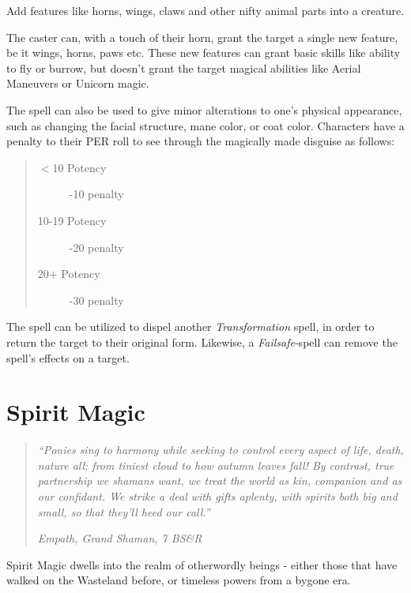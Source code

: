 \documentclass[11pt,a4paper,twocolumn]{book}
\begin{document}
Add features like horns, wings, claws and other nifty animal parts into a creature.

The caster can, with a touch of their horn, grant the target a single new feature, be it wings, horns, paws etc. These new features can grant basic skills like ability to fly or burrow, but doesn't grant the target magical abilities like Aerial Maneuvers or Unicorn magic.

The spell can also be used to give minor alterations to one's physical appearance, such as changing the facial structure, mane color, or coat color. Characters have a penalty to their PER roll to see through the magically made disguise as follows:

\begin{quote}
	\begin{description}
		\item[$<$10 Potency] 	-10 penalty
		\item[10-19 Potency] 	-20 penalty
		\item[20+ Potency] 		-30 penalty
	\end{description}
\end{quote}

The spell can be utilized to dispel another \textit{Transformation} spell, in order to return the target to their original form. Likewise, a \textit{Failsafe}-spell can remove the spell's effects on a target.

\vfill


\chapter{Spirit Magic}


\begin{quote}
	\emph{``Ponies sing to harmony while seeking to control every aspect of life, death, nature all; from tiniest cloud to how autumn leaves fall! By contrast, true partnership we shamans want, we treat the world as kin, companion and as our confidant. We strike a deal with gifts aplenty, with spirits both big and small, so that they'll heed our call.''}
	
	\emph{ Empath, Grand Shaman, 7 BS\&R}
\end{quote}

Spirit Magic dwells into the realm of otherwordly beings - either those that have walked on the Wasteland before, or timeless powers from a bygone era. 
\end{document}
